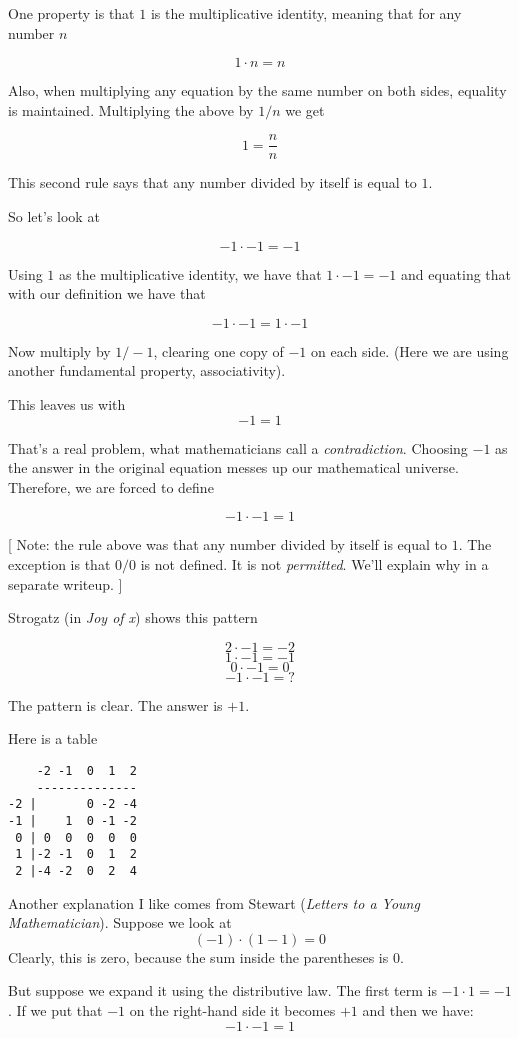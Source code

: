 \documentclass[11pt, oneside]{article}
\begin{document}
One property is that $1$ is the multiplicative identity, meaning that for any number $n$

\[ 1 \cdot n = n \]

Also, when multiplying any equation by the same number on both sides, equality is maintained.  Multiplying the above by $1/n$ we get

\[ 1 = \frac{n}{n} \]

This second rule says that any number divided by itself is equal to $1$.

So let's look at

\[ -1 \cdot -1 = -1 \]

Using $1$ as the multiplicative identity, we have that $1 \cdot -1 = -1$ and equating that with our definition we have that

\[ -1 \cdot -1 = 1 \cdot -1 \]

Now multiply by $1/-1$, clearing one copy of $-1$ on each side.  (Here we are using another fundamental property, associativity).

This leaves us with
\[ -1 = 1 \]

That's a real problem, what mathematicians call a \emph{contradiction}.  Choosing $-1$ as the answer in the original equation messes up our mathematical universe.  Therefore, we are forced to define

\[ -1 \cdot -1 = 1 \]

[ Note:  the rule above was that any number divided by itself is equal to $1$.  The exception is that  $0/0$ is not defined.  It is not \emph{permitted}.  We'll explain why in a separate writeup. ]

Strogatz (in \emph{Joy of x}) shows this pattern

\[ 2 \cdot -1 = -2 \]
\[ 1 \cdot -1 = -1 \]
\[ 0 \cdot -1 = 0 \]
\[ -1 \cdot -1 = ? \]

The pattern is clear.  The answer is $+1$.

Here is a table
\begin{verbatim}
    -2 -1  0  1  2
    --------------
-2 |       0 -2 -4
-1 |    1  0 -1 -2
 0 | 0  0  0  0  0
 1 |-2 -1  0  1  2
 2 |-4 -2  0  2  4
 \end{verbatim}
 
Another explanation I like comes from Stewart (\emph{Letters to a Young Mathematician}).  Suppose we look at 
\[ (-1) \cdot (1 - 1) = 0 \]
Clearly, this is zero, because the sum inside the parentheses is 0.

But suppose we expand it using the distributive law.  The first term is $-1 \cdot 1 = -1$.  If we put that $-1$ on the right-hand side it becomes $+1$ and then we have:
\[ -1 \cdot -1 = 1 \]
\end{document}
